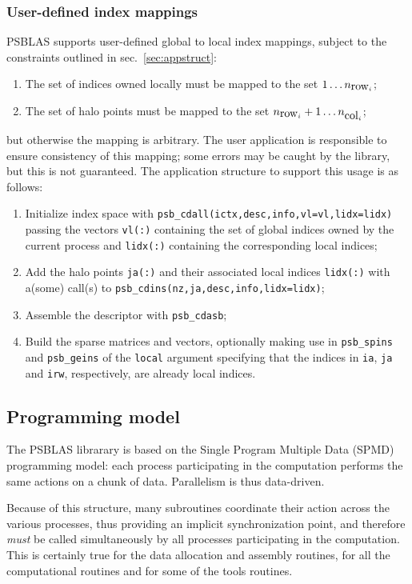 \subsubsection{User-defined index mappings}
\label{sec:usermaps}
PSBLAS supports user-defined global to local index mappings, subject
to the constraints outlined in sec.~\ref{sec:appstruct}: 
\begin{enumerate}
\item The set of indices owned locally must be mapped to the set
  $1\dots n_{\hbox{row}_i}$;
\item The set of halo points must be mapped to the set
  $n_{\hbox{row}_i}+1\dots n_{\hbox{col}_i}$;
\end{enumerate}
but otherwise the mapping is arbitrary. The user application is
responsible to ensure consistency of this mapping; some errors may be
caught by the library, but this is not guaranteed. 
The application structure to
support this usage is as follows:
\begin{enumerate}
\item Initialize index space with
  \verb|psb_cdall(ictx,desc,info,vl=vl,lidx=lidx)| passing the vectors 
  \verb|vl(:)| containing the set of global indices owned by the
  current process and   \verb|lidx(:)| containing the corresponding
  local indices;
\item Add the halo points \verb|ja(:)| and their associated local
  indices \verb|lidx(:)|  with a(some) call(s) to
  \verb|psb_cdins(nz,ja,desc,info,lidx=lidx)|; 
\item Assemble the descriptor with \verb|psb_cdasb|;
\item Build the sparse matrices and vectors, optionally making use in
  \verb|psb_spins| and \verb|psb_geins| of the \verb|local| argument
  specifying that the indices in \verb|ia|, \verb|ja| and \verb|irw|,
  respectively, are already local indices. 
\end{enumerate}


\subsection{Programming model}

The PSBLAS librarary is based on the Single Program Multiple Data
(SPMD) programming model: each process participating in the
computation performs the same actions on a chunk of data. Parallelism
is thus data-driven. 

Because of this structure, many subroutines coordinate their action
across the various processes, thus providing an implicit
synchronization point, and therefore \emph{must} be
called simultaneously by all processes participating in the
computation. This is certainly true for the data allocation and
assembly routines, for  all the computational routines and for some of
the tools routines.

